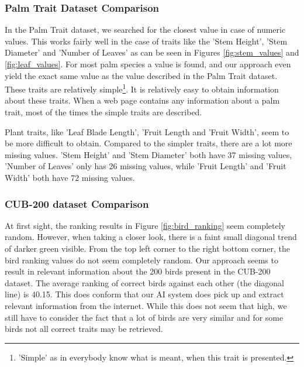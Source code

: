 \documentclass[a4paper, 12pt, oneside]{book} %
\begin{document}





\subsubsection{Palm Trait Dataset Comparison}
In the Palm Trait dataset, we searched for the closest value in case of numeric values.
This works fairly well in the case of traits like the 'Stem Height', 'Stem Diameter' and 'Number of Leaves' as can be seen in Figures \ref{fig:stem_values} and \ref{fig:leaf_values}.
For most palm species a value is found, and our approach even yield the exact same value as the value described in the Palm Trait dataset. 
These traits are relatively simple\footnote{'Simple' as in everybody know what is meant, when this trait is presented.}.
It is relatively easy to obtain information about these traits.
When a web page contains any information about a palm trait, most of the times the simple traits are described.

Plant traits, like 'Leaf Blade Length', 'Fruit Length and 'Fruit Width', seem to be more difficult to obtain. 
Compared to the simpler traits, there are a lot more missing values.
'Stem Height' and 'Stem Diameter' both have 37 missing values, 'Number of Leaves' only has 26 missing values, while 'Fruit Length' and 'Fruit Width' both have 72 missing values.

\subsubsection{CUB-200 dataset Comparison}
At first sight, the ranking results in Figure \ref{fig:bird_ranking} seem completely random.
However, when taking a closer look, there is a faint small diagonal trend of darker green visible.
From the top left corner to the right bottom corner, the bird ranking values do not seem completely random.
Our approach seems to result in relevant information about the 200 birds present in the CUB-200 dataset.
The average ranking of correct birds against each other (the diagonal line) is 40.15.
This does conform that our AI system does pick up and extract relevant information from the internet.
While this does not seem that high, we still have to consider the fact that a lot of birds are very similar and for some birds not all correct traits may be retrieved.
\end{document}
